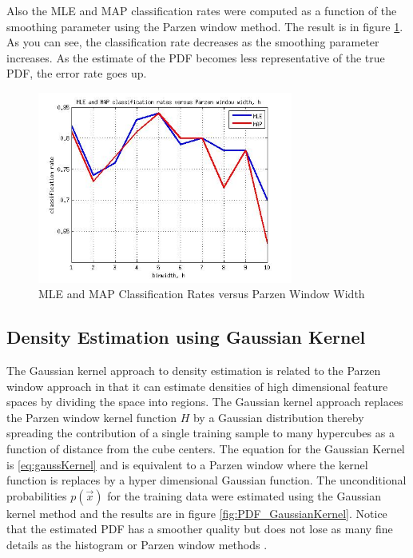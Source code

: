 \documentclass[journal]{IEEEtran}
\begin{document}
\par Also the MLE and MAP classification rates were computed as a function of the smoothing parameter using the Parzen window method. The result is in figure \ref{fig:ClassRate_Parzen}. As you can see, the classification rate decreases as the smoothing parameter increases. As the estimate of the PDF becomes less representative of the true PDF, the error rate goes up.

\begin{figure}[h]
\centering
\includegraphics[width=3.3in]{../images/ClassRate_Parzen.jpg}
\caption{MLE and MAP Classification Rates versus Parzen Window Width}
\label{fig:ClassRate_Parzen}
\end{figure}

\subsection{Density Estimation using Gaussian Kernel}
\par The Gaussian kernel approach to density estimation is related to the Parzen window approach in that it can estimate densities of high dimensional feature spaces by dividing the space into regions. The Gaussian kernel approach replaces the Parzen window kernel function \(H\) by a Gaussian distribution thereby spreading the contribution of a single training sample to many hypercubes as a function of distance from the cube centers. The equation for the Gaussian Kernel is \ref{eq:gaussKernel} and is equivalent to a Parzen window where the kernel function is replaces by a hyper dimensional Gaussian function. The unconditional probabilities \(p(\vec{x})\) for the training data were estimated using the Gaussian kernel method and the results are in figure \ref{fig:PDF_GaussianKernel}. Notice that the estimated PDF has a smoother quality but does not lose as many fine details as the histogram or Parzen window methods \cite{densityhandout}.
\end{document}
